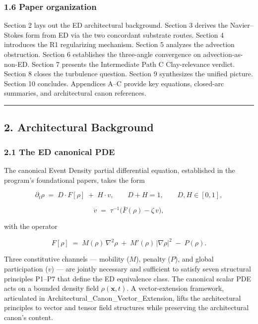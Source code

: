 \documentclass[
]{article}
\begin{document}
\subsubsection{1.6 Paper organization}\label{paper-organization}

Section 2 lays out the ED architectural background. Section 3 derives
the Navier--Stokes form from ED via the two concordant substrate routes.
Section 4 introduces the R1 regularizing mechanism. Section 5 analyzes
the advection obstruction. Section 6 establishes the three-angle
convergence on advection-as-non-ED. Section 7 presents the Intermediate
Path C Clay-relevance verdict. Section 8 closes the turbulence question.
Section 9 synthesizes the unified picture. Section 10 concludes.
Appendices A--C provide key equations, closed-arc summaries, and
architectural canon references.

\begin{center}\rule{0.5\linewidth}{0.5pt}\end{center}

\subsection{2. Architectural Background}\label{architectural-background}

\subsubsection{2.1 The ED canonical PDE}\label{the-ed-canonical-pde}

The canonical Event Density partial differential equation, established
in the program's foundational papers, takes the form

\[\partial_t \rho \;=\; D \cdot F[\rho] \;+\; H \cdot v, \qquad D + H = 1, \qquad D, H \in [0, 1],\]

\[\dot v \;=\; \tau^{-1}\bigl(\bar F(\rho) - \zeta\, v\bigr),\]

with the operator

\[F[\rho] \;=\; M(\rho)\,\nabla^2 \rho \;+\; M'(\rho)\,|\nabla\rho|^2 \;-\; P(\rho).\]

Three constitutive channels --- mobility (\(M\)), penalty (\(P\)), and
global participation (\(v\)) --- are jointly necessary and sufficient to
satisfy seven structural principles P1--P7 that define the ED
equivalence class. The canonical scalar PDE acts on a bounded density
field \(\rho(\mathbf{x}, t)\). A vector-extension framework, articulated
in Architectural\_Canon\_Vector\_Extension, lifts the architectural
principles to vector and tensor field structures while preserving the
architectural canon's content.
\end{document}
